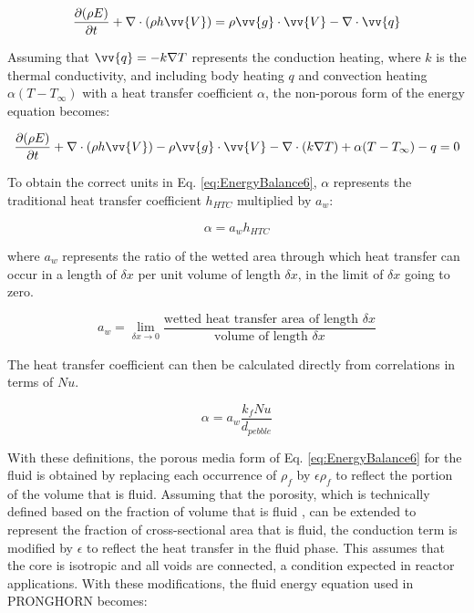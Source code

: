\documentclass[10pt]{article}
\numberwithin{equation}{section} %
\begin{document}
\begin{equation}
\label{eq:EnergyBalance5}
\begin{aligned}
\frac{\partial (\rho E)}{\partial t}+\nabla\cdot(\rho h\vv{V})=\rho \vv{g}\cdot\vv{V}-\nabla\cdot\vv{q}\\
\end{aligned}
\end{equation}

Assuming that \(\vv{q}=-k\nabla T\) represents the conduction heating, where \(k\) is the thermal conductivity, and including body heating \(q\) and convection heating \(\alpha(T-T_\infty)\) with a heat transfer coefficient \(\alpha\), the non-porous form of the energy equation becomes:

\begin{equation}
\label{eq:EnergyBalance6}
\begin{aligned}
\frac{\partial (\rho E)}{\partial t}+\nabla\cdot(\rho h\vv{V})-\rho \vv{g}\cdot\vv{V}-\nabla\cdot(k\nabla T)+\alpha(T-T_\infty)-q=0\\
\end{aligned}
\end{equation}

To obtain the correct units in Eq. \eqref{eq:EnergyBalance6}, \(\alpha\) represents the traditional heat transfer coefficient \(h_{HTC}\) multiplied by \(a_w\):

\begin{equation}
\label{eq:Alpha}
\alpha=a_wh_{HTC}
\end{equation}

where \(a_w\) represents the ratio of the wetted area through which heat transfer can occur in a length of \(\delta x\) per unit volume of length \(\delta x\), in the limit of \(\delta x\) going to zero.

\begin{equation}
\label{eq:AwLimit}
a_w=\lim_{\delta x\to 0} \frac{\text{wetted heat transfer area of length } \delta x}{\text{volume of length }\delta x}
\end{equation}

The heat transfer coefficient can then be calculated directly from correlations in terms of \(Nu\).

\begin{equation}
\label{eq:AlphaNu}
\alpha=a_w\frac{k_f Nu}{d_{pebble}}
\end{equation} %

With these definitions, the porous media form of Eq. \eqref{eq:EnergyBalance6} for the fluid is obtained by replacing each occurrence of \(\rho_f\) by \(\epsilon\rho_f\) to reflect the portion of the volume that is fluid. Assuming that the porosity, which is technically defined based on the fraction of volume that is fluid , can be extended to represent the fraction of cross-sectional area that is fluid, the conduction term is modified by \(\epsilon\) to reflect the heat transfer in the fluid phase. This assumes that the core is isotropic and all voids are connected, a condition expected in reactor applications. With these modifications, the fluid energy equation used in PRONGHORN becomes:
\end{document}
